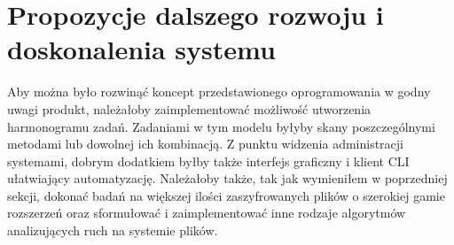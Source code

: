 \section{Propozycje dalszego rozwoju i doskonalenia systemu}

Aby można było rozwinąć koncept przedstawionego oprogramowania w godny uwagi produkt, należałoby zaimplementować możliwość utworzenia harmonogramu zadań. Zadaniami w tym modelu byłyby skany poszczególnymi metodami lub dowolnej ich kombinacją. Z punktu widzenia administracji systemami, dobrym dodatkiem byłby także interfejs graficzny i klient CLI ułatwiający automatyzację. Należałoby także, tak jak wymieniłem w poprzedniej sekcji, dokonać badań na większej ilości zaszyfrowanych plików o szerokiej gamie rozszerzeń oraz sformułować i zaimplementować inne rodzaje algorytmów analizujących ruch na systemie plików.